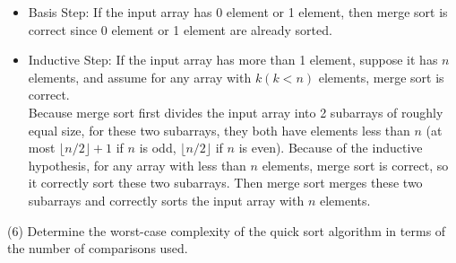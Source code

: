 \documentclass[11pt]{article}
\begin{document}
\begin{solution}
{{\begin{itemize}
\item Basis Step: If the input array has 0 element or 1 element, then merge sort is correct since 0 element or 1 element are already sorted.
\item Inductive Step: If the input array has more than 1 element, suppose it has $n$ elements, and assume for any array with $k (k<n)$ elements, merge sort is correct.
\\Because merge sort first divides the input array into 2 subarrays of roughly equal size, for these two subarrays, they both have elements less than $n$ (at most $\lfloor n/2 \rfloor + 1$ if $n$ is odd, $\lfloor n/2 \rfloor$ if $n$ is even). Because of the inductive hypothesis, for any array with less than $n$ elements, merge sort is correct, so it correctly sort these two subarrays. Then merge sort merges these two subarrays and correctly sorts the input array with $n$ elements.
\end{itemize}
}
}
\noindent{}
\item
\item (6) Determine the worst-case complexity of the quick sort algorithm in terms of the number of comparisons used.
 \item
\noindent{}

\end{solution}
\end{document}
